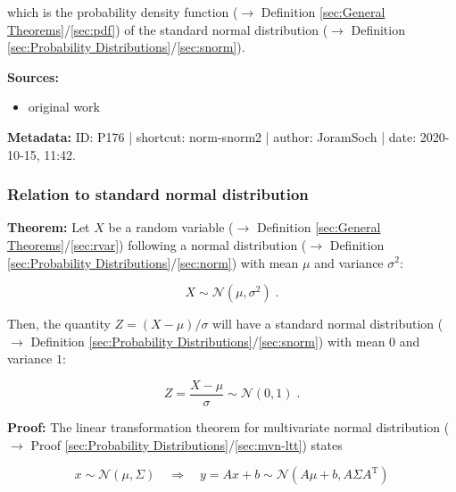 \documentclass[a4paper,12pt,twoside]{book}
\begin{document}
which is the probability density function ($\rightarrow$ Definition \ref{sec:General Theorems}/\ref{sec:pdf}) of the standard normal distribution ($\rightarrow$ Definition \ref{sec:Probability Distributions}/\ref{sec:snorm}).


\vspace{1em}
\textbf{Sources:}
\begin{itemize}
\item original work\end{itemize}


\vspace{1em}
\textbf{Metadata:} ID: P176 | shortcut: norm-snorm2 | author: JoramSoch | date: 2020-10-15, 11:42.
\vspace{1em}



\subsubsection[\textbf{Relation to standard normal distribution}]{Relation to standard normal distribution} \label{sec:norm-snorm3}
\setcounter{equation}{0}

\textbf{Theorem:} Let $X$ be a random variable ($\rightarrow$ Definition \ref{sec:General Theorems}/\ref{sec:rvar}) following a normal distribution ($\rightarrow$ Definition \ref{sec:Probability Distributions}/\ref{sec:norm}) with mean $\mu$ and variance $\sigma^2$:

\begin{equation} \label{eq:norm-snorm3-X-norm}
X \sim \mathcal{N}(\mu, \sigma^2) \; .
\end{equation}

Then, the quantity $Z = (X-\mu)/\sigma$ will have a standard normal distribution ($\rightarrow$ Definition \ref{sec:Probability Distributions}/\ref{sec:snorm}) with mean $0$ and variance $1$:

\begin{equation} \label{eq:norm-snorm3-Z-snorm}
Z = \frac{X-\mu}{\sigma} \sim \mathcal{N}(0, 1) \; .
\end{equation}


\vspace{1em}
\textbf{Proof:} The linear transformation theorem for multivariate normal distribution ($\rightarrow$ Proof \ref{sec:Probability Distributions}/\ref{sec:mvn-ltt}) states

\begin{equation} \label{eq:norm-snorm3-mvn-ltt}
x \sim \mathcal{N}(\mu, \Sigma) \quad \Rightarrow \quad y = Ax + b \sim \mathcal{N}(A\mu + b, A \Sigma A^\mathrm{T})
\end{equation}
\end{document}
